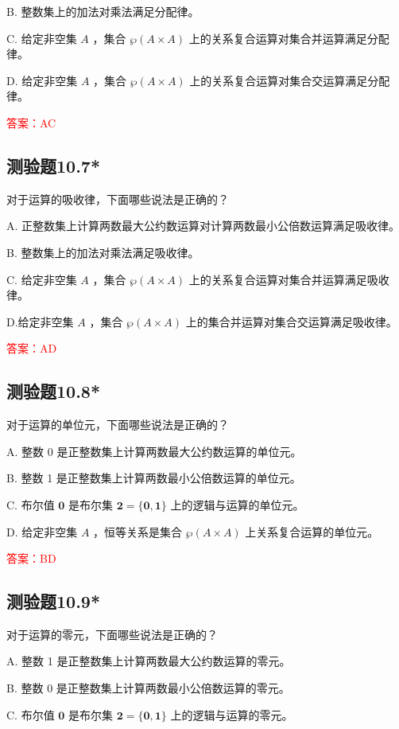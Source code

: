 \documentclass[UTF8, heading=true]{ctexart}
\begin{document}
B. 整数集上的加法对乘法满足分配律。

C. 给定非空集 $A$ ，集合 $\wp(A \times A)$ 上的关系复合运算对集合并运算满足分配律。

D. 给定非空集 $A$ ，集合 $\wp(A \times A)$ 上的关系复合运算对集合交运算满足分配律。

\textcolor{red}{答案：AC}

\subsection{测验题10.7*}

对于运算的吸收律，下面哪些说法是正确的？

A. 正整数集上计算两数最大公约数运算对计算两数最小公倍数运算满足吸收律。

B. 整数集上的加法对乘法满足吸收律。

C. 给定非空集 $A$ ，集合 $\wp(A \times A)$ 上的关系复合运算对集合并运算满足吸收律。

D.给定非空集 $A$ ，集合 $\wp(A \times A)$ 上的集合并运算对集合交运算满足吸收律。

\textcolor{red}{答案：AD}

\subsection{测验题10.8*}

对于运算的单位元，下面哪些说法是正确的？

A. 整数 0 是正整数集上计算两数最大公约数运算的单位元。

B. 整数 1 是正整数集上计算两数最小公倍数运算的单位元。

C. 布尔值 $\mathbf{0}$ 是布尔集 $\mathbf{2}=\{\mathbf{0}, \mathbf{1}\}$ 上的逻辑与运算的单位元。

D. 给定非空集 $A$ ，恒等关系是集合 $\wp(A \times A)$ 上关系复合运算的单位元。

\textcolor{red}{答案：BD}

\subsection{测验题10.9*}

对于运算的零元，下面哪些说法是正确的？

A. 整数 1 是正整数集上计算两数最大公约数运算的零元。

B. 整数 0 是正整数集上计算两数最小公倍数运算的零元。

C. 布尔值 $\mathbf{0}$ 是布尔集 $\mathbf{2}=\{\mathbf{0}, \mathbf{1}\}$ 上的逻辑与运算的零元。
\end{document}
